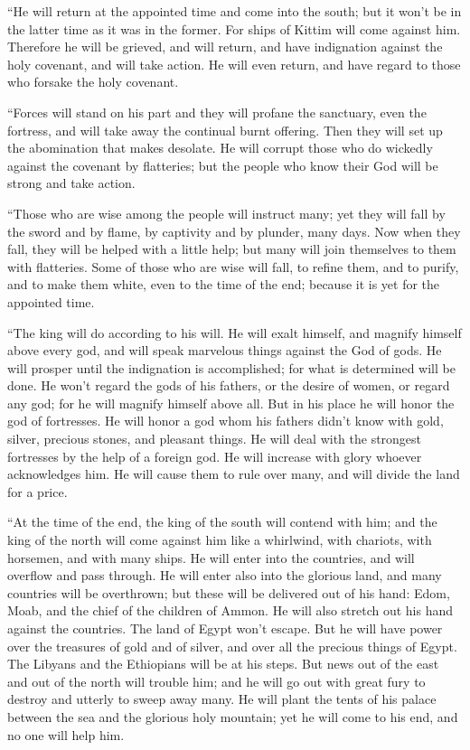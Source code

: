  ``He will return at the appointed time and come into the
south; but it won't be in the latter time as it was in the former.
 For ships of Kittim will come against him. Therefore he
will be grieved, and will return, and have indignation against the holy
covenant, and will take action. He will even return, and have regard to
those who forsake the holy covenant.

 ``Forces will stand on his part and they will profane the
sanctuary, even the fortress, and will take away the continual burnt
offering. Then they will set up the abomination that makes desolate.
 He will corrupt those who do wickedly against the covenant
by flatteries; but the people who know their God will be strong and take
action.

 ``Those who are wise among the people will instruct many;
yet they will fall by the sword and by flame, by captivity and by
plunder, many days.  Now when they fall, they will be
helped with a little help; but many will join themselves to them with
flatteries.  Some of those who are wise will fall, to
refine them, and to purify, and to make them white, even to the time of
the end; because it is yet for the appointed time.

 ``The king will do according to his will. He will exalt
himself, and magnify himself above every god, and will speak marvelous
things against the God of gods. He will prosper until the indignation is
accomplished; for what is determined will be done.  He
won't regard the gods of his fathers, or the desire of women, or regard
any god; for he will magnify himself above all.  But in his
place he will honor the god of fortresses. He will honor a god whom his
fathers didn't know with gold, silver, precious stones, and pleasant
things.  He will deal with the strongest fortresses by the
help of a foreign god. He will increase with glory whoever acknowledges
him. He will cause them to rule over many, and will divide the land for
a price.

 ``At the time of the end, the king of the south will
contend with him; and the king of the north will come against him like a
whirlwind, with chariots, with horsemen, and with many ships. He will
enter into the countries, and will overflow and pass through.
 He will enter also into the glorious land, and many
countries will be overthrown; but these will be delivered out of his
hand: Edom, Moab, and the chief of the children of Ammon. 
He will also stretch out his hand against the countries. The land of
Egypt won't escape.  But he will have power over the
treasures of gold and of silver, and over all the precious things of
Egypt. The Libyans and the Ethiopians will be at his steps.
 But news out of the east and out of the north will trouble
him; and he will go out with great fury to destroy and utterly to sweep
away many.  He will plant the tents of his palace between
the sea and the glorious holy mountain; yet he will come to his end, and
no one will help him.


